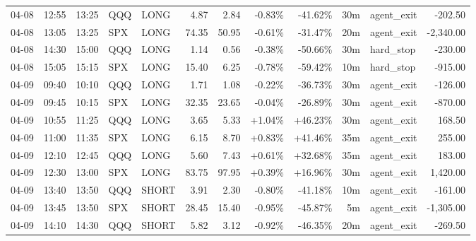 \documentclass[11pt,a4paper,twoside]{article}
\begin{document}
\begin{center}
\begin{longtable}{>{\color{txtmain}}l l l l l r r r r r >{\color{txtmain}}l r}
04-08 & 12:55 & 13:25 & QQQ & LONG & 4.87 & 2.84 & \textcolor{lossred}{-0.83\%} & \textcolor{lossred}{-41.62\%} & 30m & agent\_exit & \textcolor{lossred}{-202.50} \\
04-08 & 13:05 & 13:25 & SPX & LONG & 74.35 & 50.95 & \textcolor{lossred}{-0.61\%} & \textcolor{lossred}{-31.47\%} & 20m & agent\_exit & \textcolor{lossred}{-2,340.00} \\
04-08 & 14:30 & 15:00 & QQQ & LONG & 1.14 & 0.56 & \textcolor{lossred}{-0.38\%} & \textcolor{lossred}{-50.66\%} & 30m & hard\_stop & \textcolor{lossred}{-230.00} \\
04-08 & 15:05 & 15:15 & SPX & LONG & 15.40 & 6.25 & \textcolor{lossred}{-0.78\%} & \textcolor{lossred}{-59.42\%} & 10m & hard\_stop & \textcolor{lossred}{-915.00} \\
04-09 & 09:40 & 10:10 & QQQ & LONG & 1.71 & 1.08 & \textcolor{lossred}{-0.22\%} & \textcolor{lossred}{-36.73\%} & 30m & agent\_exit & \textcolor{lossred}{-126.00} \\
04-09 & 09:45 & 10:15 & SPX & LONG & 32.35 & 23.65 & \textcolor{lossred}{-0.04\%} & \textcolor{lossred}{-26.89\%} & 30m & agent\_exit & \textcolor{lossred}{-870.00} \\
04-09 & 10:55 & 11:25 & QQQ & LONG & 3.65 & 5.33 & \textcolor{wingreen}{+1.04\%} & \textcolor{wingreen}{+46.23\%} & 30m & agent\_exit & \textcolor{wingreen}{168.50} \\
04-09 & 11:00 & 11:35 & SPX & LONG & 6.15 & 8.70 & \textcolor{wingreen}{+0.83\%} & \textcolor{wingreen}{+41.46\%} & 35m & agent\_exit & \textcolor{wingreen}{255.00} \\
04-09 & 12:10 & 12:45 & QQQ & LONG & 5.60 & 7.43 & \textcolor{wingreen}{+0.61\%} & \textcolor{wingreen}{+32.68\%} & 35m & agent\_exit & \textcolor{wingreen}{183.00} \\
04-09 & 12:30 & 13:00 & SPX & LONG & 83.75 & 97.95 & \textcolor{wingreen}{+0.39\%} & \textcolor{wingreen}{+16.96\%} & 30m & agent\_exit & \textcolor{wingreen}{1,420.00} \\
04-09 & 13:40 & 13:50 & QQQ & SHORT & 3.91 & 2.30 & \textcolor{lossred}{-0.80\%} & \textcolor{lossred}{-41.18\%} & 10m & agent\_exit & \textcolor{lossred}{-161.00} \\
04-09 & 13:45 & 13:50 & SPX & SHORT & 28.45 & 15.40 & \textcolor{lossred}{-0.95\%} & \textcolor{lossred}{-45.87\%} & 5m & agent\_exit & \textcolor{lossred}{-1,305.00} \\
04-09 & 14:10 & 14:30 & QQQ & SHORT & 5.82 & 3.12 & \textcolor{lossred}{-0.92\%} & \textcolor{lossred}{-46.35\%} & 20m & agent\_exit & \textcolor{lossred}{-269.50} \\

\end{longtable}
\end{center}
\end{document}
